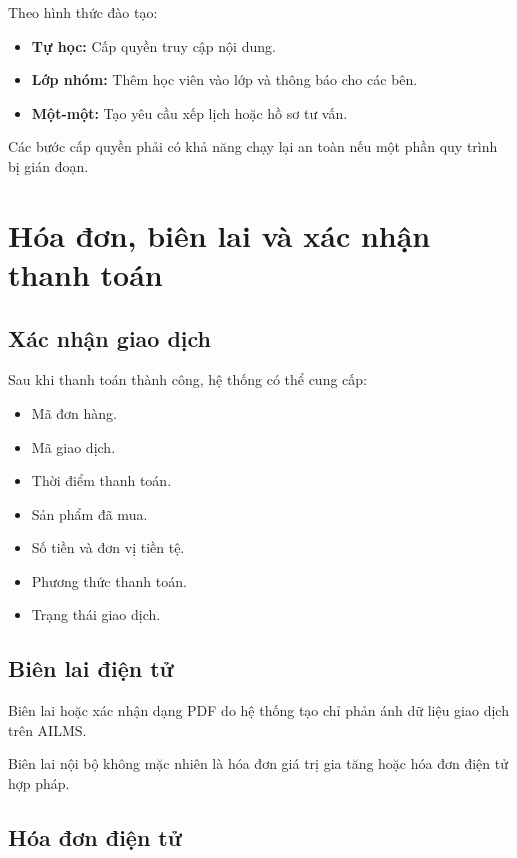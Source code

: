 \documentclass[12pt,a4paper]{article}
\begin{document}
Theo hình thức đào tạo:

\begin{itemize}
    \item \textbf{Tự học:} Cấp quyền truy cập nội dung.
    \item \textbf{Lớp nhóm:} Thêm học viên vào lớp và thông báo cho các bên.
    \item \textbf{Một-một:} Tạo yêu cầu xếp lịch hoặc hồ sơ tư vấn.
\end{itemize}

Các bước cấp quyền phải có khả năng chạy lại an toàn
nếu một phần quy trình bị gián đoạn.

\section{Hóa đơn, biên lai và xác nhận thanh toán}

\subsection{Xác nhận giao dịch}

Sau khi thanh toán thành công, hệ thống có thể cung cấp:

\begin{itemize}
    \item Mã đơn hàng.
    \item Mã giao dịch.
    \item Thời điểm thanh toán.
    \item Sản phẩm đã mua.
    \item Số tiền và đơn vị tiền tệ.
    \item Phương thức thanh toán.
    \item Trạng thái giao dịch.
\end{itemize}

\subsection{Biên lai điện tử}

Biên lai hoặc xác nhận dạng PDF do hệ thống tạo
chỉ phản ánh dữ liệu giao dịch trên AILMS.

Biên lai nội bộ không mặc nhiên là hóa đơn giá trị gia tăng
hoặc hóa đơn điện tử hợp pháp.

\subsection{Hóa đơn điện tử}
\end{document}
